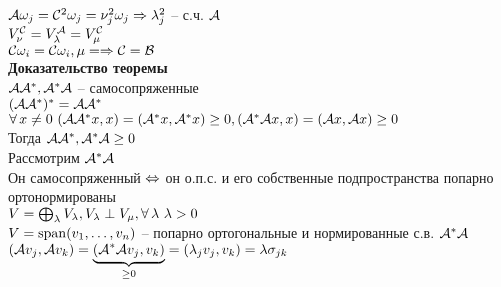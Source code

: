 \documentclass[12pt]{article}
\begin{document}
$\mcA\omega_j = \mcC^2 \omega_j = \nu^2_j \omega_j \Rto \lambda_j^2$ -- с.ч. $\mcA$\\
$V_\nu^\mcC = V_\lambda^\mcA = V_\mu^\mcC$\\
$\mcC \omega_i = \mcC\omega_i, \mu =  \Rto \mcC = \mcB$\\
\textbf{Доказательство теоремы}\\
$\mcA\mcA^*, \mcA^*\mcA$ -- самосопряженные\\
$(\mcA\mcA^*)^* = \mcA\mcA^*$\\
$\fall x \neq 0\ (\mcA\mcA^*x, x) = (\mcA^* x, \mcA^* x) \geq 0, (\mcA^*\mcA x, x) =(\mcA x, \mcA x) \geq 0$\\
Тогда $\mcA\mcA^*, \mcA^*\mcA \geq 0$\\
Рассмотрим $\mcA^*\mcA$\\
Он самосопряженный $\LRto$ он о.п.с. и его собственные подпространства попарно ортонормированы\\
$V = \bigoplus_\lambda V_\lambda, V_\lambda \perp V_\mu, \fall \lambda\ \lambda > 0$\\
$V = \span(v_1, \ldots, v_n)$ -- попарно ортогональные и нормированные с.в. $\mcA^*\mcA$\\
$(\mcA v_j, \mcA v_k) = \ub{\geq 0}{(\mcA^* \mcA v_j, v_k)} = (\lambda_j v_j, v_k) = \lambda\sigma_{jk}$
\end{document}
